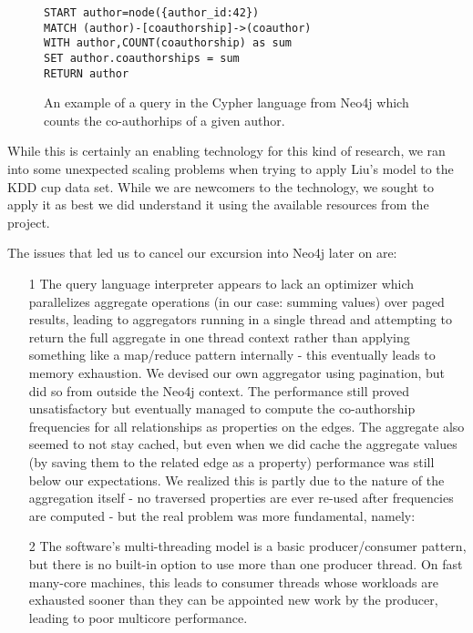 \begin{figure}
\centering
\begin{verbatim}
START author=node({author_id:42})
MATCH (author)-[coauthorship]->(coauthor)
WITH author,COUNT(coauthorship) as sum
SET author.coauthorships = sum
RETURN author
\end{verbatim}
\caption{An example of a query in the Cypher language from Neo4j which counts the co-authorhips of a given author.}
\label{fig:cypher}
\end{figure}

While this is certainly an enabling technology for this kind of research, we ran into some unexpected scaling problems when trying to apply Liu's model to the KDD cup data set.
While we are newcomers to the technology, we sought to apply it as best we did understand it using the available resources from the project.

The issues that led us to cancel our excursion into Neo4j later on are:

\begin{enumerate}
\item[1] The query language interpreter appears to lack an optimizer which parallelizes aggregate operations (in our case: summing values) over paged results, leading to aggregators running in a single thread and attempting to return the full aggregate in one thread context rather than applying something like a map/reduce pattern internally - this eventually leads to memory exhaustion.
We devised our own aggregator using pagination, but did so from outside the Neo4j context.
The performance still proved unsatisfactory but eventually managed to compute the co-authorship frequencies for all relationships as properties on the edges.
The aggregate also seemed to not stay cached, but even when we did cache the aggregate values (by saving them to the related edge as a property) performance was still below our expectations.
We realized this is partly due to the nature of the aggregation itself - no traversed properties are ever re-used after frequencies are computed - but the real problem was more fundamental, namely:

\item[2] The software's multi-threading model is a basic producer/consumer pattern, but there is no built-in option to use more than one producer thread.
	On fast many-core machines, this leads to consumer threads whose workloads are exhausted sooner than they can be appointed new work by the producer, leading to poor multicore performance.
\end{enumerate}

